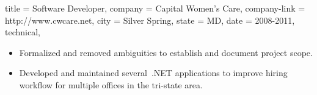 \begin{position}
  {
    title   = Software Developer,
    company = Capital Women's Care,
    company-link = http://www.cwcare.net,
    city    = Silver Spring,
    state   = MD,
    date    = 2008-2011,
    technical,
  }

\begin{itemize}
\item Formalized and removed ambiguities to establish and document project scope.
\item Developed and maintained several \CSharp\,.NET applications to
  improve hiring workflow for multiple offices in the tri-state area.
\end{itemize}
\end{position}
